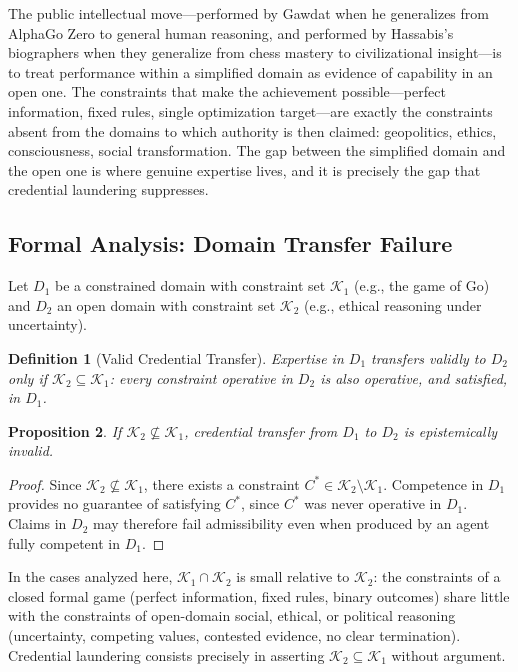 \documentclass[12pt, a4paper]{article}
\newtheorem{definition}{Definition}[section]
\newtheorem{proposition}[definition]{Proposition}
\begin{document}
The public intellectual move---performed by Gawdat when he generalizes from AlphaGo Zero to
general human reasoning, and performed by Hassabis's biographers when they generalize from chess
mastery to civilizational insight---is to treat performance within a simplified domain as evidence
of capability in an open one. The constraints that make the achievement possible---perfect
information, fixed rules, single optimization target---are exactly the constraints absent from the
domains to which authority is then claimed: geopolitics, ethics, consciousness, social
transformation. The gap between the simplified domain and the open one is where genuine expertise
lives, and it is precisely the gap that credential laundering suppresses.

\subsection{Formal Analysis: Domain Transfer Failure}

Let $D_1$ be a constrained domain with constraint set $\mathcal{K}_1$ (e.g., the game of Go) and
$D_2$ an open domain with constraint set $\mathcal{K}_2$ (e.g., ethical reasoning under
uncertainty).

\begin{definition}[Valid Credential Transfer]
Expertise in $D_1$ transfers validly to $D_2$ only if $\mathcal{K}_2 \subseteq \mathcal{K}_1$:
every constraint operative in $D_2$ is also operative, and satisfied, in $D_1$.
\end{definition}

\begin{proposition}
If $\mathcal{K}_2 \not\subseteq \mathcal{K}_1$, credential transfer from $D_1$ to $D_2$ is
epistemically invalid.
\end{proposition}

\begin{proof}
Since $\mathcal{K}_2 \not\subseteq \mathcal{K}_1$, there exists a constraint $C^* \in
\mathcal{K}_2 \setminus \mathcal{K}_1$. Competence in $D_1$ provides no guarantee of satisfying
$C^*$, since $C^*$ was never operative in $D_1$. Claims in $D_2$ may therefore fail admissibility
even when produced by an agent fully competent in $D_1$.
\end{proof}

In the cases analyzed here, $\mathcal{K}_1 \cap \mathcal{K}_2$ is small relative to
$\mathcal{K}_2$: the constraints of a closed formal game (perfect information, fixed rules, binary
outcomes) share little with the constraints of open-domain social, ethical, or political reasoning
(uncertainty, competing values, contested evidence, no clear termination). Credential laundering
consists precisely in asserting $\mathcal{K}_2 \subseteq \mathcal{K}_1$ without argument.
\end{document}
